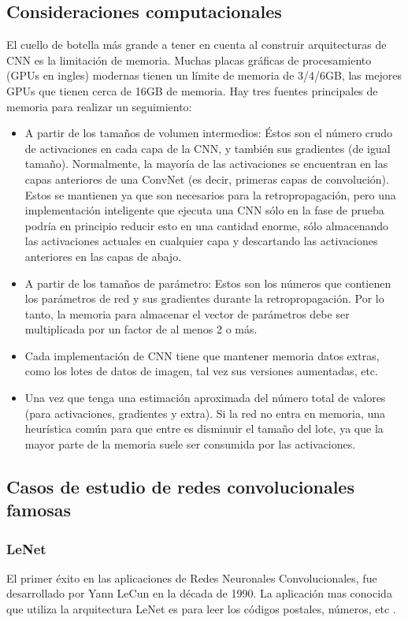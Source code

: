 \documentclass[a4paper,11pt,spanish]{book}
\begin{document}
    \subsection {Consideraciones computacionales}
      El cuello de botella más grande a tener en cuenta al construir arquitecturas de CNN es la limitación de memoria.
      Muchas placas gráficas de procesamiento (GPUs en ingles) modernas tienen un límite de memoria de 3/4/6GB, las mejores GPUs que tienen cerca de 16GB de memoria.
      Hay tres fuentes principales de memoria para realizar un seguimiento:
      \begin{itemize}
	\item A partir de los tamaños de volumen intermedios: Éstos son el número crudo de activaciones en cada capa de la CNN, y también sus gradientes (de igual tamaño).
	  Normalmente, la mayoría de las activaciones se encuentran en las capas anteriores de una ConvNet (es decir, primeras capas de convolución).
	  Estos se mantienen ya que son necesarios para la retropropagación, pero una implementación inteligente que ejecuta una CNN sólo en la fase de prueba podría
	  en principio reducir esto en una cantidad enorme, sólo almacenando las activaciones actuales en cualquier capa y descartando las activaciones anteriores
	  en las capas de abajo.
	\item A partir de los tamaños de parámetro: Estos son los números que contienen los parámetros de red y sus gradientes durante la retropropagación.
	  Por lo tanto, la memoria para almacenar el vector de parámetros debe ser multiplicada por un factor de al menos 2 o más.
	\item Cada implementación de CNN tiene que mantener memoria datos extras, como los lotes de datos de imagen, tal vez sus versiones aumentadas, etc.
	\item Una vez que tenga una estimación aproximada del número total de valores (para activaciones, gradientes y extra). Si la red no entra en memoria, una heurística común
	  para que entre es disminuir el tamaño del lote, ya que la mayor parte de la memoria suele ser consumida por las activaciones.
      \end{itemize}
\fi

    \subsection {Casos de estudio de redes convolucionales famosas}

      \subsubsection{LeNet}
	 El primer éxito en las aplicaciones de Redes Neuronales Convolucionales, fue desarrollado por Yann LeCun en la década de 1990. La aplicación mas conocida que utiliza la arquitectura
	 LeNet es para leer los códigos postales, números, etc \cite{Lecun:LeNet}.
\end{document}
